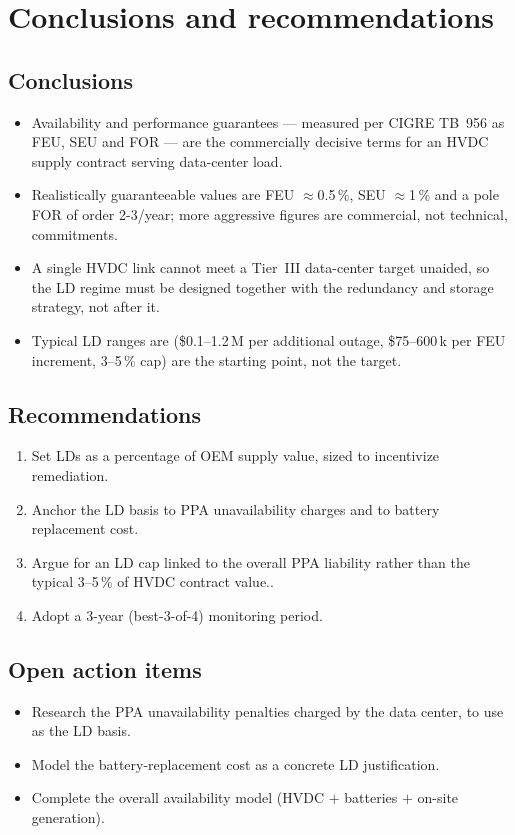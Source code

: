 \section{Conclusions and recommendations}

\subsection{Conclusions}
\begin{itemize}\setlength{\itemsep}{0.25em}
  \item Availability and performance guarantees --- measured per CIGRE TB~956 as
        FEU, SEU and FOR --- are the commercially decisive terms for an HVDC
        supply contract serving data-center load.
  \item Realistically guaranteeable values are FEU $\approx$0.5\,\%,
        SEU $\approx$1\,\% and a pole FOR of order 2-3/year; more aggressive
        figures are commercial, not technical, commitments.
  \item A single HVDC link cannot meet a Tier~III data-center target unaided, so
        the LD regime must be designed together with the redundancy and storage
        strategy, not after it.
  \item Typical LD ranges are (\$0.1--1.2\,M per additional outage, \$75--600\,k per FEU
        increment, 3--5\,\% cap) are the starting point, not the target.
\end{itemize}

\subsection{Recommendations}
\begin{enumerate}\setlength{\itemsep}{0.25em}
  \item Set LDs as a percentage of OEM supply value, sized to incentivize
        remediation.
  \item Anchor the LD basis to PPA unavailability charges and to battery
        replacement cost.
  \item Argue for an LD cap linked to the overall PPA liability rather than the
        typical 3--5\,\% of HVDC contract value..
  \item Adopt a 3-year (best-3-of-4) monitoring period.
\end{enumerate}

\subsection{Open action items}
\begin{itemize}\setlength{\itemsep}{0.2em}
  \item Research the PPA unavailability penalties charged by the data center, to
        use as the LD basis.
  \item Model the battery-replacement cost as a concrete LD justification.
  \item Complete the overall availability model (HVDC $+$ batteries $+$ on-site
        generation).
\end{itemize}

